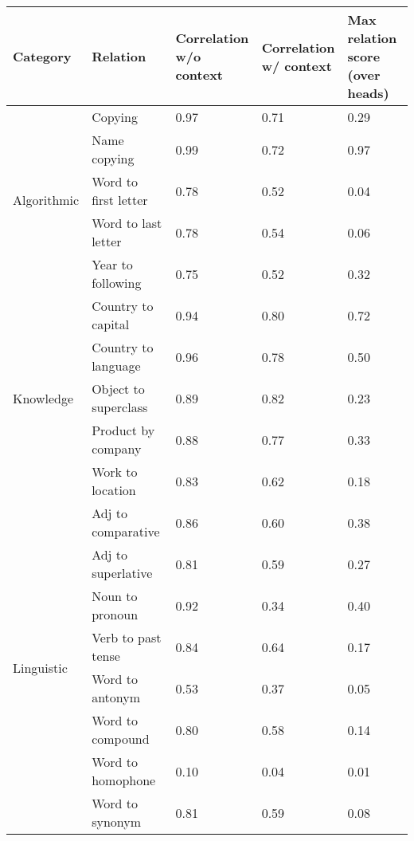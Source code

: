 \begin{tabular}{lllll}
\toprule
Category & Relation & \makecell{Correlation\\w/o context} & \makecell{Correlation\\w/ context} & \makecell{Max relation score\\(over heads)} \\
\midrule
\multirow{5}{*}{Algorithmic} & Copying & 0.97 & 0.71 & 0.29 \\
 & Name copying & 0.99 & 0.72 & 0.97 \\
 & Word to first letter & 0.78 & 0.52 & 0.04 \\
 & Word to last letter & 0.78 & 0.54 & 0.06 \\
 & Year to following & 0.75 & 0.52 & 0.32 \\
\multirow{5}{*}{Knowledge} & Country to capital & 0.94 & 0.80 & 0.72 \\
 & Country to language & 0.96 & 0.78 & 0.50 \\
 & Object to superclass & 0.89 & 0.82 & 0.23 \\
 & Product by company & 0.88 & 0.77 & 0.33 \\
 & Work to location & 0.83 & 0.62 & 0.18 \\
\multirow{8}{*}{Linguistic} & Adj to comparative & 0.86 & 0.60 & 0.38 \\
 & Adj to superlative & 0.81 & 0.59 & 0.27 \\
 & Noun to pronoun & 0.92 & 0.34 & 0.40 \\
 & Verb to past tense & 0.84 & 0.64 & 0.17 \\
 & Word to antonym & 0.53 & 0.37 & 0.05 \\
 & Word to compound & 0.80 & 0.58 & 0.14 \\
 & Word to homophone & 0.10 & 0.04 & 0.01 \\
 & Word to synonym & 0.81 & 0.59 & 0.08 \\
\bottomrule
\end{tabular}

